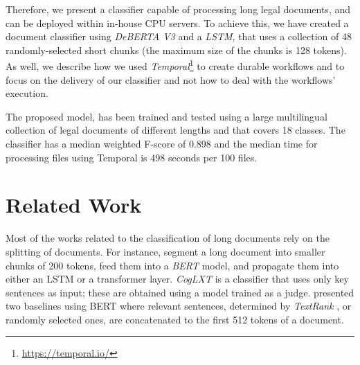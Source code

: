 \documentclass[11pt]{article}
\begin{document}
    Therefore, we present a classifier capable of processing long legal documents, and can be deployed within in-house CPU servers. To achieve this, we have created a document classifier using \textit{DeBERTA V3} \cite{he_debertav3_2021} and a \textit{LSTM}, that uses a collection of 48 randomly-selected short chunks (the maximum size of the chunks is 128 tokens). As well, we describe how we used \textit{Temporal}\footnote{\href{https://temporal.io/}{https://temporal.io/}} to create durable workflows and to focus on the delivery of our classifier and not how to deal with the workflows' execution.

    The proposed model, has been trained and tested using a large multilingual collection of legal documents of different lengths and that covers 18 classes. The classifier has a median weighted F-score of 0.898 and the median time for processing files using Temporal is 498 seconds per 100 files.

\section{Related Work}
\label{sec: RelatedWork}

    Most of the works related to the classification of long documents rely on the splitting of documents. For instance,  \citet{pappagari_hierarchical_2019} segment a long document into smaller chunks of 200 tokens, feed them into a \textit{BERT} \cite{devlin_bert_2019} model, and propagate them into either an LSTM or a transformer layer. \textit{CogLXT} \cite{ding_cogltx_2020} is a classifier that uses only key sentences as input; these are obtained using a model trained as a judge. \citet{park_efficient_2022} presented two baselines using BERT where relevant sentences, determined by \textit{TextRank} \cite{mihalcea-tarau-2004-textrank}, or randomly selected ones, are concatenated to the first 512 tokens of a document.
    
    
\end{document}
